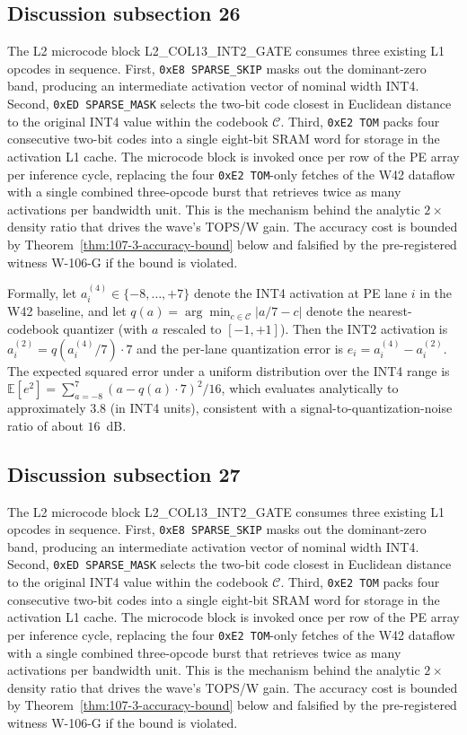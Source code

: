 \subsection{Discussion subsection 26}

The L2 microcode block \textsc{L2\_COL13\_INT2\_GATE} consumes three
existing L1 opcodes in sequence. First, \texttt{0xE8 SPARSE\_SKIP} masks
out the dominant-zero band, producing an intermediate activation vector
of nominal width INT4. Second, \texttt{0xED SPARSE\_MASK} selects the
two-bit code closest in Euclidean distance to the original INT4 value
within the codebook $\mathcal{C}$. Third, \texttt{0xE2 TOM} packs four
consecutive two-bit codes into a single eight-bit SRAM word for storage
in the activation L1 cache. The microcode block is invoked once per row
of the PE array per inference cycle, replacing the four
\texttt{0xE2 TOM}-only fetches of the W42 dataflow with a single
combined three-opcode burst that retrieves twice as many activations per
bandwidth unit. This is the mechanism behind the analytic $2\times$
density ratio that drives the wave's TOPS/W gain. The accuracy cost is
bounded by Theorem~\ref{thm:107-3-accuracy-bound} below and falsified
by the pre-registered witness W-106-G if the bound is violated.

Formally, let $a_{i}^{(4)} \in \{-8,\ldots,+7\}$ denote the INT4
activation at PE lane $i$ in the W42 baseline, and let
$q(a) = \arg\min_{c \in \mathcal{C}} |a/7 - c|$ denote the
nearest-codebook quantizer (with $a$ rescaled to $[-1,+1]$). Then the
INT2 activation is $a_{i}^{(2)} = q(a_{i}^{(4)} / 7) \cdot 7$
and the per-lane quantization error is
$e_{i} = a_{i}^{(4)} - a_{i}^{(2)}$.
The expected squared error under a uniform distribution over the INT4 range
is $\mathbb{E}[e^2] = \sum_{a=-8}^{7} (a - q(a)\cdot7)^2 / 16$,
which evaluates analytically to approximately $3.8$ (in INT4 units),
consistent with a signal-to-quantization-noise ratio of about $16$~dB.


\subsection{Discussion subsection 27}

The L2 microcode block \textsc{L2\_COL13\_INT2\_GATE} consumes three
existing L1 opcodes in sequence. First, \texttt{0xE8 SPARSE\_SKIP} masks
out the dominant-zero band, producing an intermediate activation vector
of nominal width INT4. Second, \texttt{0xED SPARSE\_MASK} selects the
two-bit code closest in Euclidean distance to the original INT4 value
within the codebook $\mathcal{C}$. Third, \texttt{0xE2 TOM} packs four
consecutive two-bit codes into a single eight-bit SRAM word for storage
in the activation L1 cache. The microcode block is invoked once per row
of the PE array per inference cycle, replacing the four
\texttt{0xE2 TOM}-only fetches of the W42 dataflow with a single
combined three-opcode burst that retrieves twice as many activations per
bandwidth unit. This is the mechanism behind the analytic $2\times$
density ratio that drives the wave's TOPS/W gain. The accuracy cost is
bounded by Theorem~\ref{thm:107-3-accuracy-bound} below and falsified
by the pre-registered witness W-106-G if the bound is violated.

